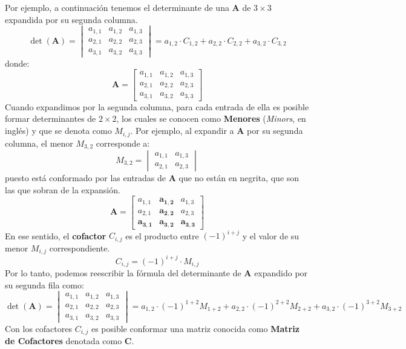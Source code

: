 \documentclass[12pt]{article}
\begin{document}
Por ejemplo, a continuación tenemos el determinante de una $\mathbf{A}$ de $3 \times 3$ expandida por su segunda columna.
\[
\det(\mathbf{A}) =
\begin{vmatrix}
a_{1,1} & a_{1,2} & a_{1,3} \\
a_{2,1} & a_{2,2} & a_{2,3} \\
a_{3,1} & a_{3,2} & a_{3,3}
\end{vmatrix} =
a_{1,2} \cdot C_{1,2} + a_{2,2} \cdot C_{2,2} + a_{3,2} \cdot C_{3,2}
\]
donde:
\[
\mathbf{A} =
\begin{bmatrix}
a_{1,1} & a_{1,2} & a_{1,3} \\
a_{2,1} & a_{2,2} & a_{2,3} \\
a_{3,1} & a_{3,2} & a_{3,3}
\end{bmatrix}
\]
Cuando expandimos por la segunda columna, para cada entrada de ella es posible formar determinantes de $2 \times 2$, los cuales se conocen como \textbf{Menores} (\textit{Minors}, en inglés) y que se denota como $M_{i, j}$. Por ejemplo, al expandir a $\mathbf{A}$ por su segunda columna, el menor $M_{3, 2}$ corresponde a:
\[
M_{3, 2} =
\begin{vmatrix}
a_{1,1} & a_{1,3} \\
a_{2,1} & a_{2,3}
\end{vmatrix}
\]
puesto está conformado por las entradas de $\mathbf{A}$ que no están en negrita, que son las que sobran de la expansión.
\[
\mathbf{A} =
\begin{bmatrix}
a_{1,1} & \mathbf{a_{1,2}} & a_{1,3} \\
a_{2,1} & \mathbf{a_{2,2}} & a_{2,3} \\
\mathbf{a_{3,1}} & \mathbf{a_{3,2}} & \mathbf{a_{3,3}}
\end{bmatrix}
\]
En ese sentido, el \textbf{cofactor} $C_{i,j}$ es el producto entre $(-1)^{i + j}$ y el valor de su menor $M_{i, j}$ correspondiente.
\[
  C_{i, j} = (-1)^{i + j} \cdot M_{i, j}
\]
Por lo tanto, podemos reescribir la fórmula del determinante de $\mathbf{A}$ expandido por su segunda fila como:
\[
\det(\mathbf{A}) =
\begin{vmatrix}
a_{1,1} & a_{1,2} & a_{1,3} \\
a_{2,1} & a_{2,2} & a_{2,3} \\
a_{3,1} & a_{3,2} & a_{3,3}
\end{vmatrix} =
a_{1,2} \cdot (-1)^{1 + 2}M_{1 + 2} + a_{2,2} \cdot (-1)^{2 + 2}M_{2 + 2} + a_{3,2} \cdot (-1)^{3 + 2}M_{3 + 2}
\]
Con los cofactores $C_{i, j}$ es posible conformar una matriz conocida como \textbf{Matriz de Cofactores} denotada como $\mathbf{C}$.
\end{document}

